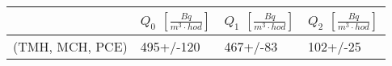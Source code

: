 \begin{tabular}{llll}
\toprule
{} & $Q_0$ $\left[\si{\frac{Bq}{m^3\cdot hod}}\right]$ & $Q_1$ $\left[\si{\frac{Bq}{m^3\cdot hod}}\right]$ & $Q_2$ $\left[\si{\frac{Bq}{m^3\cdot hod}}\right]$ \\
\midrule
(TMH, MCH, PCE) &                                         495+/-120 &                                          467+/-83 &                                          102+/-25 \\
\bottomrule
\end{tabular}
